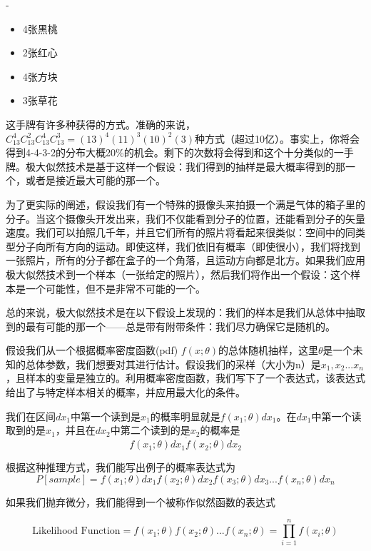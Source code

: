 \documentclass[cn,11pt,chinese]{elegantbook}
\begin{document}
{- \begin{itemize}
	\item 4张黑桃
\item 2张红心
\item  4张方块
\item  3张草花
\end{itemize}

这手牌有许多种获得的方式。准确的来说，$C_13^4 C_13^2 C_13^4 C_13^3=(13)^4(11)^3(10)^2(3)$种方式（超过10亿）。事实上，你将会得到4-4-3-2的分布大概20\%的机会。剩下的次数将会得到和这个十分类似的一手牌。极大似然技术是基于这样一个假设：我们得到的抽样是最大概率得到的那一个，或者是接近最大可能的那一个。

为了更实际的阐述，假设我们有一个特殊的摄像头来拍摄一个满是气体的箱子里的分子。当这个摄像头开发出来，我们不仅能看到分子的位置，还能看到分子的矢量速度。我们可以拍照几千年，并且它们所有的照片将看起来很类似：空间中的同类型分子向所有方向的运动。即使这样，我们依旧有概率（即使很小），我们将找到一张照片，所有的分子都在盒子的一个角落，且运动方向都是北方。如果我们应用极大似然技术到一个样本（一张给定的照片），然后我们将作出一个假设：这个样本是一个可能性，但不是非常不可能的一个。

总的来说，极大似然技术是在以下假设上发现的：我们的样本是我们从总体中抽取到的最有可能的那一个——总是带有附带条件：我们尽力确保它是随机的。

假设我们从一个根据概率密度函数(pdf) $f(x;\theta)$的总体随机抽样，这里$\theta$是一个未知的总体参数，我们想要对其进行估计。假设我们的采样（大小为n）是$x_1,x_2...x_n$，且样本的变量是独立的。利用概率密度函数，我们写下了一个表达式，该表达式给出了与特定样本相关的概率，并应用最大化的条件。

我们在区间$dx_1$中第一个读到是$x_1$的概率明显就是$f(x_1;\theta)dx_1$。在$dx_1$中第一个读取到的是$x_1$，并且在$dx_2$中第二个读到的是$x_2$的概率是
$$f(x_1;\theta)dx_1 \dot f(x_2;\theta)dx_2$$

根据这种推理方式，我们能写出例子的概率表达式为
\begin{equation}\label{eq10-39}
P[sample]=f(x_1;\theta)dx_1 f(x_2;\theta)dx_2 f(x_3;\theta)dx_3...f(x_n;\theta)dx_n
\end{equation}

如果我们抛弃微分，我们能得到一个被称作似然函数的表达式

\begin{equation}\label{eq10-40}
\text{Likelihood Function}= f(x_1;\theta)f(x_2;\theta)...f(x_n;\theta)=\prod_{i=1}^n f(x_i;\theta) 
\end{equation}

}
\end{document}
